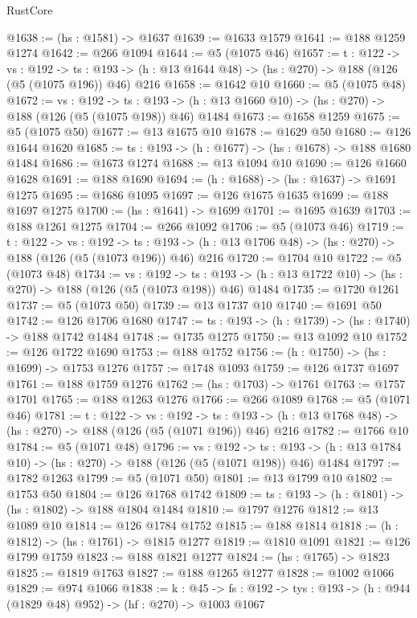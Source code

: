 \begin{lexlean}{RustCore}
\begin{coremodule}
@1638 := (hs : @1581) -> @1637
@1639 := @1633 @1579
@1641 := @188 @1259 @1274
@1642 := @266 @1094
@1644 := @5 (@1075 @46)
@1657 := {t : @122} ->
  {vs : @192} ->
  {ts : @193} -> (h : @13 @1644 @48) -> (hs : @270) -> @188 (@126 (@5 (@1075 @196)) @46) @216
@1658 := @1642 @10
@1660 := @5 (@1075 @48)
@1672 := {vs : @192} ->
  {ts : @193} -> (h : @13 @1660 @10) -> (hs : @270) -> @188 (@126 (@5 (@1075 @198)) @46) @1484
@1673 := @1658 @1259
@1675 := @5 (@1075 @50)
@1677 := @13 @1675 @10
@1678 := @1629 @50
@1680 := @126 @1644 @1620
@1685 := {ts : @193} -> (h : @1677) -> (hs : @1678) -> @188 @1680 @1484
@1686 := @1673 @1274
@1688 := @13 @1094 @10
@1690 := @126 @1660 @1628
@1691 := @188 @1690
@1694 := (h : @1688) -> (hs : @1637) -> @1691 @1275
@1695 := @1686 @1095
@1697 := @126 @1675 @1635
@1699 := @188 @1697 @1275
@1700 := (hs : @1641) -> @1699
@1701 := @1695 @1639
@1703 := @188 @1261 @1275
@1704 := @266 @1092
@1706 := @5 (@1073 @46)
@1719 := {t : @122} ->
  {vs : @192} ->
  {ts : @193} -> (h : @13 @1706 @48) -> (hs : @270) -> @188 (@126 (@5 (@1073 @196)) @46) @216
@1720 := @1704 @10
@1722 := @5 (@1073 @48)
@1734 := {vs : @192} ->
  {ts : @193} -> (h : @13 @1722 @10) -> (hs : @270) -> @188 (@126 (@5 (@1073 @198)) @46) @1484
@1735 := @1720 @1261
@1737 := @5 (@1073 @50)
@1739 := @13 @1737 @10
@1740 := @1691 @50
@1742 := @126 @1706 @1680
@1747 := {ts : @193} -> (h : @1739) -> (hs : @1740) -> @188 @1742 @1484
@1748 := @1735 @1275
@1750 := @13 @1092 @10
@1752 := @126 @1722 @1690
@1753 := @188 @1752
@1756 := (h : @1750) -> (hs : @1699) -> @1753 @1276
@1757 := @1748 @1093
@1759 := @126 @1737 @1697
@1761 := @188 @1759 @1276
@1762 := (hs : @1703) -> @1761
@1763 := @1757 @1701
@1765 := @188 @1263 @1276
@1766 := @266 @1089
@1768 := @5 (@1071 @46)
@1781 := {t : @122} ->
  {vs : @192} ->
  {ts : @193} -> (h : @13 @1768 @48) -> (hs : @270) -> @188 (@126 (@5 (@1071 @196)) @46) @216
@1782 := @1766 @10
@1784 := @5 (@1071 @48)
@1796 := {vs : @192} ->
  {ts : @193} -> (h : @13 @1784 @10) -> (hs : @270) -> @188 (@126 (@5 (@1071 @198)) @46) @1484
@1797 := @1782 @1263
@1799 := @5 (@1071 @50)
@1801 := @13 @1799 @10
@1802 := @1753 @50
@1804 := @126 @1768 @1742
@1809 := {ts : @193} -> (h : @1801) -> (hs : @1802) -> @188 @1804 @1484
@1810 := @1797 @1276
@1812 := @13 @1089 @10
@1814 := @126 @1784 @1752
@1815 := @188 @1814
@1818 := (h : @1812) -> (hs : @1761) -> @1815 @1277
@1819 := @1810 @1091
@1821 := @126 @1799 @1759
@1823 := @188 @1821 @1277
@1824 := (hs : @1765) -> @1823
@1825 := @1819 @1763
@1827 := @188 @1265 @1277
@1828 := @1002 @1066
@1829 := @974 @1066
@1838 := {k : @45} ->
  {fs : @192} -> {tys : @193} -> (h : @944 (@1829 @48) @952) -> (hf : @270) -> @1003 @1067

\end{coremodule}
\end{lexlean}
